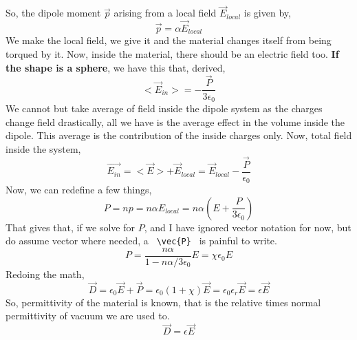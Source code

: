 \documentclass[12pt,a4paper]{memoir}
\begin{document}
So, the dipole moment $\vec{p}$ arising from a local field $\vec{E}_{local}$ is given by,
\begin{equation}
\vec{p} = \alpha \vec{E}_{local}
\end{equation}
We make the local field, we give it and the material changes itself from being torqued by it. Now, inside the material, there should be an electric field too. \textbf{If the shape is a sphere}, we have this that, derived,
\begin{equation}
< \vec{E}_{in} > = -\frac{\vec{P}}{3 \epsilon_0}
\end{equation}
We cannot but take average of field inside the dipole system as the charges change field drastically, all we have is the average effect in the volume inside the dipole. This average is the contribution of the inside charges only. Now, total field inside the system,
\begin{equation}
\vec{E_{in}} = <\vec{E}> + \vec{E}_{local} = \vec{E}_{local}  - \frac{\vec{P}}{\epsilon_0}
\end{equation}
Now, we can redefine a few things,
\[ P = np = n \alpha E_{local} = n \alpha 
\left( E + \frac{P}{3 \epsilon_0} \right) \]
That gives that, if we solve for $P$, and I have ignored vector
notation for now, but do assume vector where needed, a 
\verb| \vec{P} | is painful to write. 
\begin{equation}
P = 
\frac{n \alpha}{1- n \alpha / 3 \epsilon_0} E 
= 
\chi \epsilon_0 E
\end{equation}
Redoing the math,
\begin{equation}
\vec{D} = \epsilon_0 \vec{E} + \vec{P} 
=
\epsilon_0 (1 + \chi) \vec{E}
= 
\epsilon_0 \epsilon_r \vec{E} =
\epsilon \vec{E}
\end{equation}
So, permittivity of the material is known, that is the 
relative times normal permittivity of vacuum we are used to. 
\begin{equation}
\vec{D} = \epsilon \vec{E}
\end{equation}
   
\end{document}
